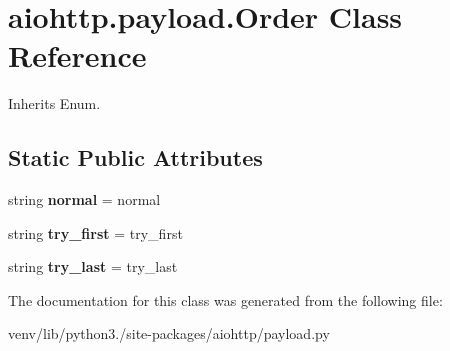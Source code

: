 \hypertarget{classaiohttp_1_1payload_1_1_order}{}\section{aiohttp.\+payload.\+Order Class Reference}
\label{classaiohttp_1_1payload_1_1_order}


Inherits Enum.

\subsection*{Static Public Attributes}
\begin{DoxyCompactItemize}
\item 
\mbox{\label{classaiohttp_1_1payload_1_1_order_a8f21d15654d7e3547ad88d35a907c921}} 
string {\bfseries normal} = \textquotesingle{}normal\textquotesingle{}
\item 
\mbox{\label{classaiohttp_1_1payload_1_1_order_ab947101ac9c33a8146aae029aef6cc61}} 
string {\bfseries try\+\_\+first} = \textquotesingle{}try\+\_\+first\textquotesingle{}
\item 
\mbox{\label{classaiohttp_1_1payload_1_1_order_aaa8618b0b2b7262545071e7526e486b0}} 
string {\bfseries try\+\_\+last} = \textquotesingle{}try\+\_\+last\textquotesingle{}
\end{DoxyCompactItemize}


The documentation for this class was generated from the following file\+:\begin{DoxyCompactItemize}
\item 
venv/lib/python3./site-\/packages/aiohttp/payload.\+py\end{DoxyCompactItemize}
